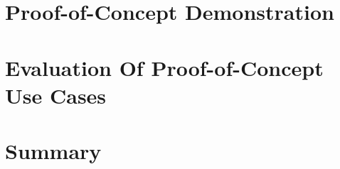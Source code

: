 \section{Proof-of-Concept Demonstration}
\section{Evaluation Of Proof-of-Concept Use Cases}
\section{Summary}







%
%
%
%
%
%
%
